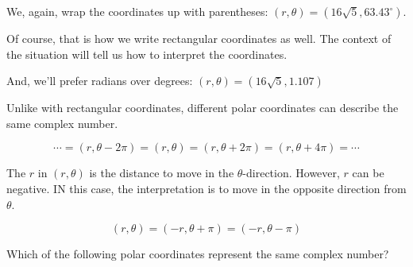 \documentclass{ximera}
\begin{document}
We, again, wrap the coordinates up with parentheses: $(r, \theta) = (16\sqrt{5}, 63.43^{\circ})$.

Of course, that is how we write rectangular coordinates as well.  The context of the situation will tell us how to interpret the coordinates.

And, we'll prefer radians over degrees: $(r, \theta) = (16\sqrt{5}, 1.107)$










\begin{warning}


Unlike with rectangular coordinates, different polar coordinates can describe the same complex number.

\[
 \cdots = (r, \theta - 2\pi) = (r, \theta) = (r, \theta + 2\pi) = (r, \theta + 4\pi) = \cdots
\]

\end{warning}






\begin{warning}


The $r$ in $(r, \theta)$ is the distance to move in the $\theta$-direction.  However, $r$ can be negative. IN this case, the interpretation is to move in the opposite direction from $\theta$.

\[
 (r, \theta) = (-r, \theta + \pi) = (-r, \theta - \pi)
\]

\end{warning}







\begin{question}
Which of the following polar coordinates represent the same complex number?
\begin{selectAll}
\end{selectAll}
\end{question}
\end{document}
